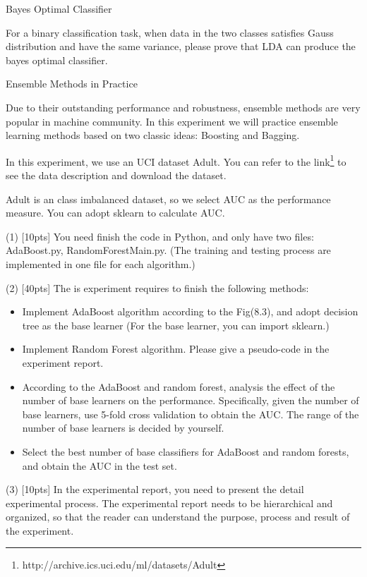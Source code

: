 \documentclass[11pt, a4paper, UTF8]{ctexart}
\begin{document}
\begin{problem}[ML problem 2]
	[20pts] Bayes Optimal Classifier

	For a binary classification task, when data in the two classes satisfies Gauss distribution and have the same variance, please prove that LDA can produce the bayes optimal classifier.
\end{problem}
\begin{solution}


\end{solution}
\begin{problem}[ML problem 3]
	[60pts] Ensemble Methods in Practice
	
	Due to their outstanding performance and robustness, ensemble methods are very popular in machine community. In this experiment we will practice ensemble learning methods based on two classic
	ideas: Boosting and Bagging.
	
	In this experiment, we use an UCI dataset Adult. You can refer to the link\footnote{http://archive.ics.uci.edu/ml/datasets/Adult} to see the data description and download the dataset.
	
	Adult is an class imbalanced dataset, so we select AUC as the performance measure. You can adopt sklearn to calculate AUC.
	
(1) [10pts] You need finish the code in Python, and only have two files: AdaBoost.py, RandomForestMain.py. (The training and testing process are implemented in one file for each algorithm.)
	
(2) [40pts] The is experiment requires to finish the following methods:
	
		\begin{itemize}
			\item Implement AdaBoost algorithm according to the Fig(8.3), and adopt decision tree as the base learner (For the base learner, you can import sklearn.)
			\item  Implement Random Forest algorithm. Please give a pseudo-code in the experiment report.
			\item According to the AdaBoost and random forest, analysis the effect of the number of base learners on the performance. Specifically, given the number of base learners, use 5-fold cross validation to obtain the AUC. The range of the number of base learners is decided by yourself.
			\item Select the best number of base classifiers for AdaBoost and random forests, and obtain the AUC in the test set.
		\end{itemize}

(3) [10pts] In the experimental report, you need to present the detail experimental process. The experimental report needs to be hierarchical and organized, so that the reader can understand the purpose, process and result of the experiment.
		
\end{problem}
\end{document}
